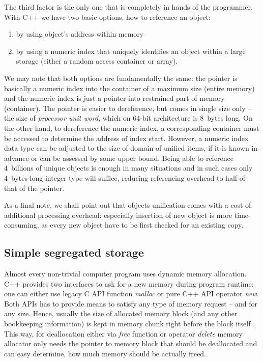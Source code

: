 The third factor is the only one that is completely in hands of the programmer.
With C++ we have two basic options, how to reference an object:
\begin{enumerate}
  \item by using object's address within memory
  \item by using a numeric index that uniquely identifies an object within a large storage
  (either a random access container or array).
\end{enumerate}

We may note that both options are fundamentally the same:
the pointer is basically a numeric index into the container of a maximum size (entire memory)
and the numeric index is just a pointer into restrained part of memory (container).
The pointer is easier to dereference, but comes in single size only -- the size of
\emph{processor unit word}, which on 64-bit architecture is 8~bytes long.
On the other hand, to dereference the numeric index, a corresponding container must be
accessed to determine the address of index start.
However, a numeric index data type can be adjusted to the size of domain of unified items,
if it is known in advance or can be assessed by some upper bound.
Being able to reference 4~billions of unique objects is enough in many situations and
in such cases only 4~bytes long integer type will suffice, reducing referencing overhead
to half of that of the pointer.

As a final note, we shall point out that objects unification comes with a cost of
additional processing overhead: especially insertion of new object is more time-consuming,
as every new object have to be first checked for an existing copy.

\subsection{Simple segregated storage}

Almost every non-trivial computer program uses dynamic memory allocation.
C++ provides two interfaces to ask for a new memory during program runtime:
one can either use legacy C API function \emph{malloc} or pure C++ API operator \emph{new}.
Both APIs has to provide means to satisfy any type of memory request -- and for any size.
Hence, usually the size of allocated memory block (and any other bookkeeping information) is
kept in memory chunk right before the block itself \citep[Chapter 10]{meyers:effective-cpp}.
This way, for deallocation either via \emph{free} function or operator \emph{delete}
memory allocator only needs the pointer to memory block that should be deallocated and
can easy determine, how much memory should be actually freed.

